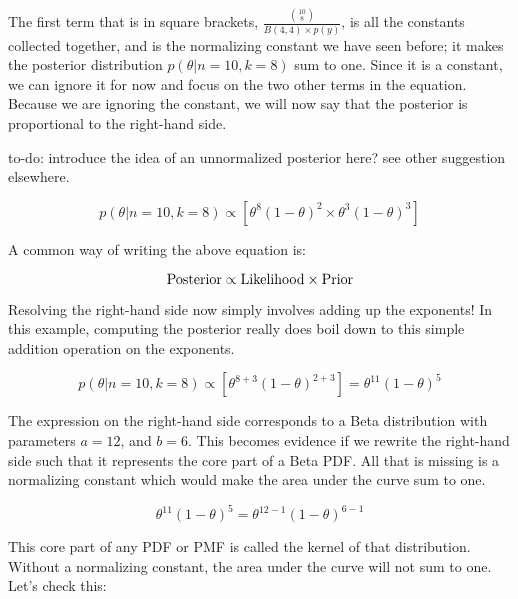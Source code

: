 \documentclass[12pt,]{krantz}
\newenvironment{Shaded}{\begin{snugshade}}{\end{snugshade}}
\newcommand{\ControlFlowTok}[1]{\textcolor[rgb]{0.13,0.29,0.53}{\textbf{#1}}}
\newcommand{\DataTypeTok}[1]{\textcolor[rgb]{0.13,0.29,0.53}{#1}}
\newcommand{\DecValTok}[1]{\textcolor[rgb]{0.00,0.00,0.81}{#1}}
\newcommand{\KeywordTok}[1]{\textcolor[rgb]{0.13,0.29,0.53}{\textbf{#1}}}
\newcommand{\NormalTok}[1]{#1}
\newcommand{\OperatorTok}[1]{\textcolor[rgb]{0.81,0.36,0.00}{\textbf{#1}}}
\newcommand{\StringTok}[1]{\textcolor[rgb]{0.31,0.60,0.02}{#1}}
\let\BeginKnitrBlock\begin \let\EndKnitrBlock\end
\begin{document}
The first term that is in square brackets, \(\frac{\binom{10}{8}}{B(4,4)\times p(y)}\), is all the constants collected together, and is the normalizing constant we have seen before; it makes the posterior distribution \(p(\theta|n=10,k=8)\) sum to one. Since it is a constant, we can ignore it for now and focus on the two other terms in the equation. Because we are ignoring the constant, we will now say that the posterior is proportional to the right-hand side.

\BeginKnitrBlock{rmdnote}
to-do: introduce the idea of an unnormalized posterior here? see other suggestion elsewhere.
\EndKnitrBlock{rmdnote}

\begin{equation}
p(\theta|n=10,k=8) \propto   [\theta^8 (1-\theta)^{2} \times \theta^{3} (1-\theta)^{3} ]
\label{eq:betaunpost3}
\end{equation}

A common way of writing the above equation is:

\begin{equation}
\hbox{Posterior} \propto \hbox{Likelihood} \times \hbox{Prior}
\end{equation}

Resolving the right-hand side now simply involves adding up the exponents! In this example, computing the posterior really does boil down to this simple addition operation on the exponents.

\begin{equation}
p(\theta|n=10,k=8) \propto   [\theta^{8+3} (1-\theta)^{2+3}] = \theta^{11} (1-\theta)^{5}
\label{eq:betaunpost4}
\end{equation}

The expression on the right-hand side corresponds to a Beta distribution with parameters \(a=12\), and \(b=6\). This becomes evidence if we rewrite the right-hand side such that it represents the core part of a Beta PDF. All that is missing is a normalizing constant which would make the area under the curve sum to one.

\begin{equation}
\theta^{11} (1-\theta)^{5} = \theta^{12-1} (1-\theta)^{6-1} 
\end{equation}

This core part of any PDF or PMF is called the kernel of that distribution. Without a normalizing constant, the area under the curve will not sum to one. Let's check this:

\begin{Shaded}
\end{Shaded}
\end{document}
